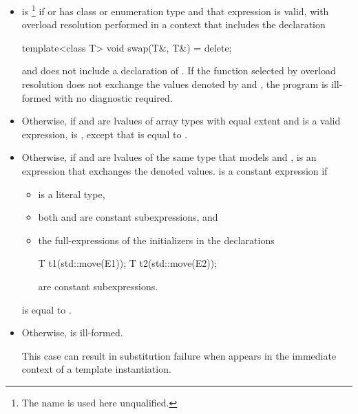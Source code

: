 \begin{itemize}
\item
   is \footnote{The name  is used
  here unqualified.} if  or 
  has class or enumeration type and that expression is valid, with
  overload resolution performed in a context that includes the declaration
\begin{codeblock}
  template<class T>
    void swap(T&, T&) = delete;
\end{codeblock}
  and does not include a declaration of .
  If the function selected by overload resolution does not
  exchange the values denoted by
   and ,
  the program is ill-formed with no diagnostic required.

\item
  Otherwise, if  and 
  are lvalues of array types
  with equal extent and 
  is a valid expression,
   is ,
  except that
   is equal to
  .

\item
  Otherwise, if  and  are lvalues of the
  same type  that models  and
  ,
   is an expression that exchanges the denoted values.
   is a constant expression if
  \begin{itemize}
  \item {} is a literal type,
  \item both  and  are
    constant subexpressions, and
  \item the full-expressions of the initializers in the declarations
\begin{codeblock}
T t1(std::move(E1));
T t2(std::move(E2));
\end{codeblock}

are constant subexpressions.
  \end{itemize}
   is equal to
  .

\item
  Otherwise,  is ill-formed.
  \begin{note}
  This case can result in substitution failure when 
  appears in the immediate context of a template instantiation.
  \end{note}
\end{itemize}

